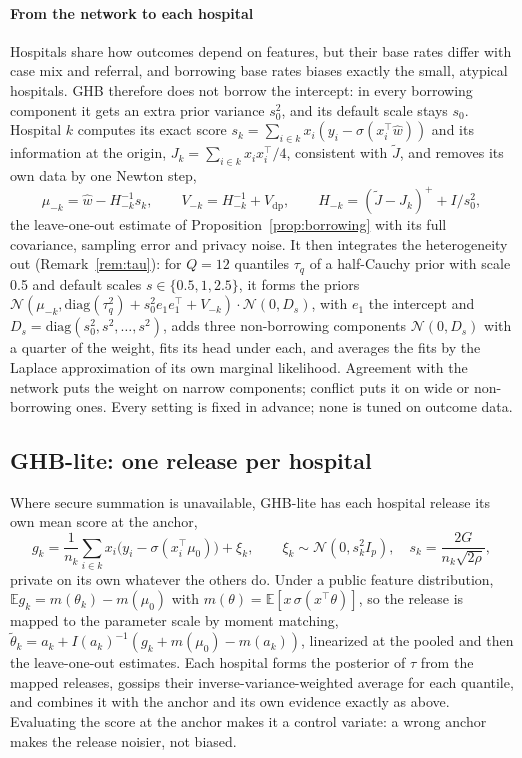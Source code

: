 \documentclass[acmsmall,screen,review]{acmart}
\theoremstyle{acmdefinition}
\begin{document}
\paragraph{From the network to each hospital} Hospitals share how outcomes depend on features, but their base rates differ with case mix and referral, and borrowing base rates biases exactly the small, atypical hospitals. GHB therefore does not borrow the intercept: in every borrowing component it gets an extra prior variance $s_0^2$, and its default scale stays $s_0$. Hospital $k$ computes its exact score $s_k=\sum_{i\in k}x_i(y_i-\sigma(x_i^{\top}\hat{w}))$ and its information at the origin, $J_k=\sum_{i\in k}x_ix_i^{\top}/4$, consistent with $\tilde J$, and removes its own data by one Newton step,
\[
\mu_{-k}=\hat{w}-H_{-k}^{-1}s_k,\qquad V_{-k}=H_{-k}^{-1}+V_{\mathrm{dp}},\qquad H_{-k}=(\tilde{J}-J_k)^{+}+I/s_0^2,
\]
the leave-one-out estimate of Proposition~\ref{prop:borrowing} with its full covariance, sampling error and privacy noise. It then integrates the heterogeneity out (Remark~\ref{rem:tau}): for $Q=12$ quantiles $\tau_q$ of a half-Cauchy prior with scale 0.5 and default scales $s\in\{0.5,1,2.5\}$, it forms the priors $\mathcal{N}(\mu_{-k},\mathrm{diag}(\tau_q^2)+s_0^2e_1e_1^{\top}+V_{-k})\cdot\mathcal{N}(0,D_s)$, with $e_1$ the intercept and $D_s=\mathrm{diag}(s_0^2,s^2,\dots,s^2)$, adds three non-borrowing components $\mathcal{N}(0,D_s)$ with a quarter of the weight, fits its head under each, and averages the fits by the Laplace approximation of its own marginal likelihood. Agreement with the network puts the weight on narrow components; conflict puts it on wide or non-borrowing ones. Every setting is fixed in advance; none is tuned on outcome data.

\subsection{GHB-lite: one release per hospital}\label{sec:lite}

Where secure summation is unavailable, GHB-lite has each hospital release its own mean score at the anchor,
\[
g_k=\frac{1}{n_k}\sum_{i\in k}x_i\bigl(y_i-\sigma(x_i^{\top}\mu_0)\bigr)+\xi_k,\qquad \xi_k\sim\mathcal{N}(0,s_k^2I_p),\quad s_k=\frac{2G}{n_k\sqrt{2\rho}},
\]
private on its own whatever the others do. Under a public feature distribution, $\mathbb{E}g_k=m(\theta_k)-m(\mu_0)$ with $m(\theta)=\mathbb{E}[x\,\sigma(x^{\top}\theta)]$, so the release is mapped to the parameter scale by moment matching, $\tilde{\theta}_k=a_k+I(a_k)^{-1}(g_k+m(\mu_0)-m(a_k))$, linearized at the pooled and then the leave-one-out estimates. Each hospital forms the posterior of $\tau$ from the mapped releases, gossips their inverse-variance-weighted average for each quantile, and combines it with the anchor and its own evidence exactly as above. Evaluating the score at the anchor makes it a control variate: a wrong anchor makes the release noisier, not biased.
\end{document}
